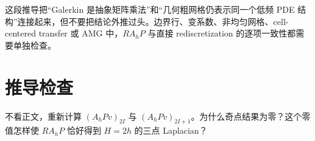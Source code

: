 这段推导把“Galerkin 是抽象矩阵乘法”和“几何粗网格仍表示同一个低频 PDE 结构”连接起来，但不要把结论外推过头。边界行、变系数、非均匀网格、cell-centered transfer 或 AMG 中，$RA_hP$ 与直接 rediscretization 的逐项一致性都需要单独检查。

\section*{推导检查}
\begin{checkpointbox}
不看正文，重新计算 $(A_hPv)_{2I}$ 与 $(A_hPv)_{2I+1}$。为什么奇点结果为零？这个零值怎样使 $RA_hP$ 恰好得到 $H=2h$ 的三点 Laplacian？
\end{checkpointbox}
